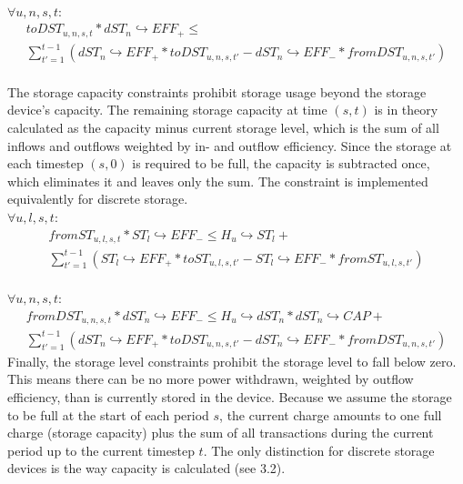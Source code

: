 \documentclass[
	11pt,								%
	DIV10,								%
	a4paper,         					%
	oneside,							%
	headheight=20pt,					%
	footheight=20pt,					%
    parskip=full,						%
    listof=totoc,						%
	bibliography=totoc,					%
	index=totoc,						%
]{scrartcl}
\begin{document}
	\\
	$\forall u,n,s,t$:
	\begin{equation}
		\begin{split}
		toDST_{u,n,s,t} * dST_n \hookrightarrow EFF_{+} \leq \\
		\sum_{t'=1}^{t-1}(dST_n \hookrightarrow EFF_{+} * toDST_{u,n,s,t'} - dST_n \hookrightarrow EFF_{-} * fromDST_{u,n,s,t'})
		\end{split}
	\end{equation}
	\\
	The storage capacity constraints prohibit storage usage beyond the storage device's capacity. The remaining storage capacity at time $(s,t)$ is in theory calculated as the capacity minus current storage level, which is the sum of all inflows and outflows weighted by in- and outflow efficiency. Since the storage at each timestep $(s,0)$ is required to be full, the capacity is subtracted once, which eliminates it and leaves only the sum. The constraint is implemented equivalently for discrete storage. 
	\\
	$\forall u,l,s,t$:
	\begin{equation}
	\begin{split}
		fromST_{u,l,s,t} * ST_l \hookrightarrow EFF_{-} \leq H_u \hookrightarrow ST_l +\\
		\sum_{t'=1}^{t-1}(ST_l \hookrightarrow EFF_{+} * toST_{u,l,s,t'} - ST_l \hookrightarrow EFF_{-} * fromST_{u,l,s,t'})
		\end{split}
	\end{equation}
	\\
	$\forall u,n,s,t$:
	\begin{equation}
	\begin{split}
		fromDST_{u,n,s,t} * dST_n \hookrightarrow EFF_{-} \leq H_u \hookrightarrow dST_n * dST_n \hookrightarrow CAP +  \\
		\sum_{t'=1}^{t-1}(dST_n \hookrightarrow EFF_{+} * toDST_{u,n,s,t'} - dST_n \hookrightarrow EFF_{-} * fromDST_{u,n,s,t'})
	\end{split}
	\end{equation}
	Finally, the storage level constraints prohibit the storage level to fall below zero. This means there can be no more power withdrawn, weighted by outflow efficiency, than is currently stored in the device. Because we assume the storage to be full at the start of each period $s$, the current charge amounts to one full charge (storage capacity) plus the sum of all transactions during the current period up to the current timestep $t$. The only distinction for discrete storage devices is the way capacity is calculated (see 3.2).
\end{document}

